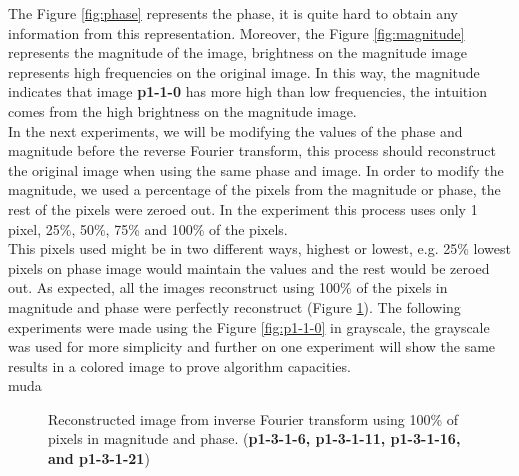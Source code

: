 \documentclass[12pt,a4paper]{article}
\begin{document}
The Figure \ref{fig:phase} represents the phase, it is quite hard to obtain any information from this representation. Moreover, the Figure \ref{fig:magnitude} represents the magnitude of the image, brightness on the magnitude image represents high frequencies on the original image. In this way, the magnitude indicates that image \textbf{p1-1-0} has more high than low frequencies, the intuition comes from the high brightness on the magnitude image. \\

In the next experiments, we will be modifying the values of the phase and magnitude before the reverse Fourier transform, this process should reconstruct the original image when using the same phase and image. In order to modify the magnitude, we used a percentage of the pixels from the magnitude or phase, the rest of the pixels were zeroed out. In the experiment this process uses only 1 pixel, 25\%, 50\%, 75\% and 100\% of the pixels. \\

This pixels used might be in two different ways, highest or lowest, e.g. 25\% lowest pixels on phase image would maintain the values and the rest would be zeroed out. As expected, all the images reconstruct using 100\% of the pixels in magnitude and phase were perfectly reconstruct (Figure \ref{fig:inverse}). The following experiments were made using the Figure \ref{fig:p1-1-0} in grayscale, the grayscale was used for more simplicity and further on one experiment will show the same results in a colored image to prove algorithm capacities. \\
muda

\begin{figure}[!h]
	\centering
	{%
		\setlength{\fboxsep}{1pt}%
		\setlength{\fboxrule}{1pt}%
	}%
	\caption{Reconstructed image from inverse Fourier transform using 100\% of pixels in magnitude and phase. (\textbf{p1-3-1-6, p1-3-1-11, p1-3-1-16, and p1-3-1-21})}
	\label{fig:inverse}
\end{figure}
\end{document}
